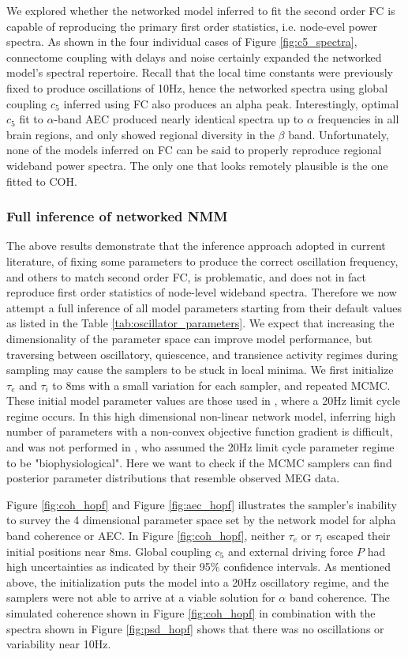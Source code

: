 We explored whether the networked model inferred to fit the second order FC is capable of reproducing the primary first order statistics, i.e. node-evel power spectra. As shown in the four individual cases of Figure \ref{fig:c5_spectra}, connectome coupling with delays and noise certainly expanded the networked model's spectral repertoire. Recall that the local time constants were previously fixed to produce oscillations of 10Hz, hence the networked spectra using global coupling $c_5$ inferred using FC also produces an alpha peak. Interestingly, optimal $c_5$ fit to $\alpha$-band AEC produced nearly identical spectra up to $\alpha$ frequencies in all brain regions, and only showed regional diversity in the $\beta$ band. Unfortunately, none of the models inferred on FC can be said to properly reproduce regional wideband power spectra. The only one that looks remotely plausible is the one fitted to COH.

\subsubsection{Full inference of networked NMM}
The above results demonstrate that the inference approach adopted in current literature, of fixing some parameters to produce the correct oscillation frequency, and others to match second order FC, is problematic, and does not in fact reproduce first order statistics of node-level wideband spectra. Therefore we now attempt a full inference of all model parameters starting from their default values as listed in the Table \ref{tab:oscillator_parameters}. We expect that increasing the dimensionality of the parameter space can improve model performance, but traversing between oscillatory, quiescence, and transience activity regimes during sampling may cause the samplers to be stuck in local minima. We first initialize $\tau_e$ and $\tau_i$ to $8$ms with a small variation for each sampler, and repeated MCMC. These initial model parameter values are those used in \cite{muldoon_stimulation-based_2016}, where a 20Hz limit cycle regime occurs. In this high dimensional non-linear network model, inferring high number of parameters with a non-convex objective function gradient is difficult, and was not performed in \cite{muldoon_stimulation-based_2016}, who assumed the 20Hz limit cycle parameter regime to be "biophysiological". Here we want to check if the MCMC samplers can find posterior parameter distributions that resemble observed MEG data.

Figure \ref{fig:coh_hopf} and Figure \ref{fig:aec_hopf} illustrates the sampler's inability to survey the 4 dimensional parameter space set by the network model for alpha band coherence or AEC. In Figure \ref{fig:coh_hopf}, neither $\tau_e$ or $\tau_i$ escaped their initial positions near 8ms. Global coupling $c_5$ and external driving force $P$ had high uncertainties as indicated by their 95\% confidence intervals. As mentioned above, the initialization puts the model into a 20Hz oscillatory regime, and the samplers were not able to arrive at a viable solution for $\alpha$ band coherence. The simulated coherence shown in Figure \ref{fig:coh_hopf} in combination with the spectra shown in Figure \ref{fig:psd_hopf} shows that there was no oscillations or variability near 10Hz.


